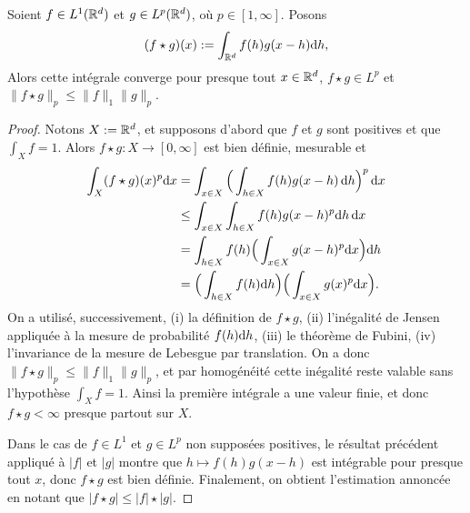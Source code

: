 \begin{proposition}
\label{prop:convolLp}
%
	Soient $f\in L^1(\mathbb{R}^d)$ et $g\in L^p(\mathbb{R}^d)$, où $p \in [1,\infty]$. Posons
	\begin{equation*}
		(f\star g) (x) := \int_{\mathbb{R}^d} f(h) g(x-h) \mathrm{d} h,
	\end{equation*}
	Alors cette intégrale converge pour presque tout $x\in \mathbb{R}^d$, $f \star g \in L^p$ et $\|f\star g\|_p \leq \|f\|_1 \|g\|_p$.
\end{proposition}

\begin{proof}
Notons $X := \mathbb{R}^d$, et supposons d'abord que $f$ et $g$ sont positives et que $\int_X f = 1$. 
	Alors $f\star g : X \to [0,\infty]$ est bien définie, mesurable et 
	\begin{align*}
		\int_X (f\star g)(x)^p \mathrm{d} x & 
		= \int_{x \in X} \Big(\int_{h \in X} f(h) g(x-h) \, \mathrm{d} h\Big)^p \, \mathrm{d} x\\
		& \leq \int_{x \in X} \int_{h \in X} f(h) g(x-h)^p \mathrm{d} h \, \mathrm{d} x\\
		& = \int_{h \in X} f(h) \Big(\int_{x \in X} g(x-h)^p \mathrm{d} x\Big) \mathrm{d} h  \\
		& = \Big(\int_{h \in X} f(h) \mathrm{d} h\Big) \Big(\int_{x \in X} g(x)^p \mathrm{d} x\Big).
	\end{align*}
	On a utilisé, successivement, (i) la définition de $f\star g$, (ii) l'inégalité de Jensen appliquée à la mesure de probabilité $f(h)\mathrm{d} h$, (iii) le théorème de Fubini, (iv) l'invariance de la mesure de Lebesgue par translation.
	On a donc $\|f\star g\|_p \leq \|f\|_1 \|g\|_p$, et par homogénéité cette inégalité reste valable sans l'hypothèse $\int_X f = 1$. 
	Ainsi la première intégrale a une valeur finie, et donc $f\star g < \infty$ presque partout sur $X$. 
	
	Dans le cas de $f\in L^1$ et $g \in L^p$ non supposées positives, le résultat précédent appliqué à $|f|$ et $|g|$ montre que $h \mapsto f(h) g(x-h)$ est intégrable pour presque tout $x$, donc $f \star g$ est bien définie. 
	Finalement, on obtient l'estimation annoncée en notant que $|f\star g| \leq |f| \star |g|$. 
\end{proof}

